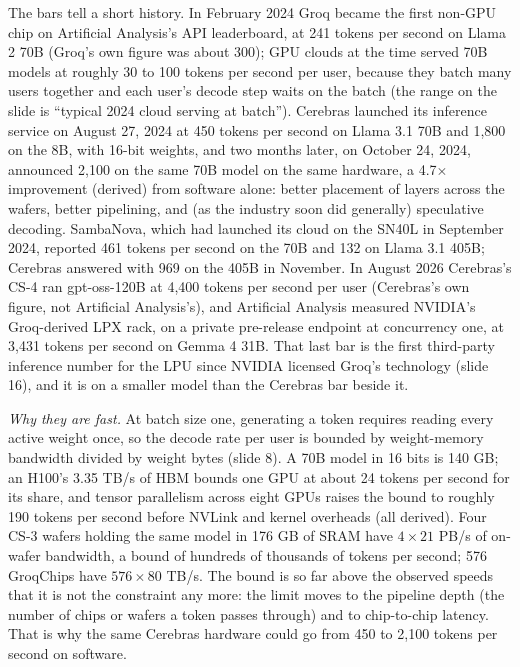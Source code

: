 \documentclass[11pt,letterpaper]{article}
\begin{document}
The bars tell a short history. In February 2024 Groq became the first non-GPU chip on Artificial Analysis's API leaderboard, at 241 tokens per second on Llama 2 70B (Groq's own figure was about 300); GPU clouds at the time served 70B models at roughly 30 to 100 tokens per second per user, because they batch many users together and each user's decode step waits on the batch (the range on the slide is ``typical 2024 cloud serving at batch''). Cerebras launched its inference service on August 27, 2024 at 450 tokens per second on Llama 3.1 70B and 1{,}800 on the 8B, with 16-bit weights, and two months later, on October 24, 2024, announced 2{,}100 on the same 70B model on the same hardware, a 4.7$\times$ improvement (derived) from software alone: better placement of layers across the wafers, better pipelining, and (as the industry soon did generally) speculative decoding. SambaNova, which had launched its cloud on the SN40L in September 2024, reported 461 tokens per second on the 70B and 132 on Llama 3.1 405B; Cerebras answered with 969 on the 405B in November. In August 2026 Cerebras's CS-4 ran gpt-oss-120B at 4{,}400 tokens per second per user (Cerebras's own figure, not Artificial Analysis's), and Artificial Analysis measured NVIDIA's Groq-derived LPX rack, on a private pre-release endpoint at concurrency one, at 3{,}431 tokens per second on Gemma 4 31B. That last bar is the first third-party inference number for the LPU since NVIDIA licensed Groq's technology (slide 16), and it is on a smaller model than the Cerebras bar beside it.

\emph{Why they are fast.} At batch size one, generating a token requires reading every active weight once, so the decode rate per user is bounded by weight-memory bandwidth divided by weight bytes (slide 8). A 70B model in 16 bits is 140 GB; an H100's 3.35 TB/s of HBM bounds one GPU at about 24 tokens per second for its share, and tensor parallelism across eight GPUs raises the bound to roughly 190 tokens per second before NVLink and kernel overheads (all derived). Four CS-3 wafers holding the same model in 176 GB of SRAM have $4\times21$ PB/s of on-wafer bandwidth, a bound of hundreds of thousands of tokens per second; 576 GroqChips have $576\times80$ TB/s. The bound is so far above the observed speeds that it is not the constraint any more: the limit moves to the pipeline depth (the number of chips or wafers a token passes through) and to chip-to-chip latency. That is why the same Cerebras hardware could go from 450 to 2{,}100 tokens per second on software.
\end{document}
